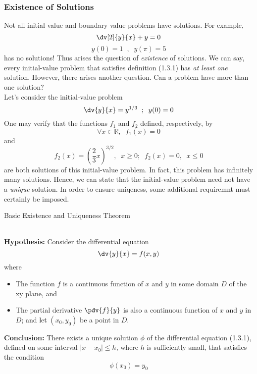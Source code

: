 \subsubsection{Existence of Solutions}

Not all initial-value and boundary-value problems have solutions. For example,\[
    \dv[2]{y}{x} + y = 0
\] \[ y(0) = 1 \;\;,\;\; y(\pi) = 5 \]
has no solutions! Thus arises the question of \textit{existence} of solutions. We can say, every initial-value problem that satisfies definition (1.3.1) has \textit{at least one} solution. However, there arises another question. Can a problem have more than one solution? \\
Let's consider the initial-value problem
\[ \dv{y}{x} = y^{1/3} \;\;;\;\;y(0) = 0 \]
One may verify that the functions $f_1$ and $f_2$ defined, respectively, by \[
    \forall x\in \mathbb{R} ,\;\; f_1(x) = 0
\] and \[
    f_2(x) = (\frac{2}{3}x)^{3/2}, \;\; x \ge 0; \;\; f_2(x) = 0, \;\; x \le 0
\] are both solutions of this initial-value problem. In fact, this problem has infinitely many solutions. Hence, we can state that the initial-value problem need not have a \textit{unique} solution. In order to ensure uniqeness, some additional requiremnt must certainly be imposed.

\begin{theorem}{Basic Existence and Uniqueness Theorem}
    
    \\\textbf{Hypothesis: }
    Consider the differential equation
    \begin{equation}
        \dv{y}{x} = f(x,y)
    \end{equation}
    where
    \begin{itemize}
        \item The function $f$ is a continuous function of $x$ and $y$ in some domain $D$ of the xy plane, and
        \item The partial derivative $\pdv{f}{y}$ is also a continuous function of $x$ and $y$ in $D$; and let $(x_0,y_0)$ be a point in $D$.
    \end{itemize}

    \textbf{Conclusion: }
    There exists a unique solution $\phi$ of the differential equation (1.3.1), defined on some interval $|x-x_0| \le h$, where $h$ is sufficiently small, that satisfies the condition
    \[
        \phi(x_0) = y_0
    \]
\end{theorem}

